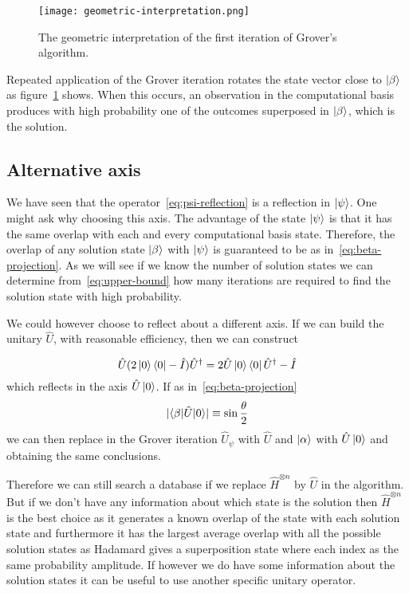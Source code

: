 \begin{figure}
\texttt{[image: geometric-interpretation.png]}
\centering
\caption{The geometric interpretation of the first iteration of Grover's algorithm.}
\label{fig:geometric-interpretation}
\end{figure}

Repeated application of the Grover iteration rotates the state vector close to $\ket{\beta}$ as figure~\ref{fig:geometric-interpretation} shows. When this occurs, an observation in the computational basis produces with high probability one of the outcomes superposed in $\ket{\beta}$, which is the solution.

\subsection{Alternative axis}
We have seen that the operator~\ref{eq:psi-reflection} is a reflection in $\ket{\psi}$. One might ask why choosing this axis. The advantage of the state $\ket{\psi}$ is that it has the same overlap with each and every computational basis state. Therefore, the overlap of any solution state $\ket{\beta}$ with $\ket{\psi}$ is guaranteed to be as in~\ref{eq:beta-projection}. As we will see if we know the number of solution states we can determine from~\ref{eq:upper-bound} how many iterations are required to find the solution state with high probability.

We could however choose to reflect about a different axis. If we can build the unitary $\hat{U}$, with reasonable efficiency, then we can construct

\begin{equation*}
    \hat{U}(2\ket{0}\bra{0}-\hat{I})\hat{U}^\dag = 2\hat{U}\ket{0}\bra{0}\hat{U}^\dag -\hat{I}
\end{equation*}
which reflects in the axis $\hat{U}\ket{0}$.
If as in~\ref{eq:beta-projection}
\begin{equation*}
    \lvert\braket{\beta | \hat{U} |0}\rvert \equiv \sin\frac{\theta}{2}
\end{equation*}
we can then replace in the Grover iteration  $\hat{U}_\psi$ with $\hat{U}$ and $\ket{\alpha}$ with $\hat{U}\ket{0}$ and obtaining the same conclusions.

Therefore we can still search a database if we replace $\hat{H}^{\otimes n}$ by $\hat{U}$ in the algorithm. But if we don't have any information about which state is the solution then $\hat{H}^{\otimes n}$ is the best choice as it generates a known overlap of the state with each solution state and furthermore it has the largest average overlap with all the possible solution states as Hadamard gives a superposition state where each index as the same probability amplitude. If however we do have some information about the solution states it can be useful to use another specific unitary operator.